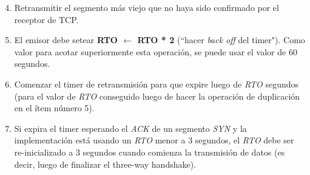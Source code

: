 \begin{enumerate}
 \setcounter{enumi}{3}
 \item Retransmitir el segmento más viejo que no haya sido confirmado
	por el receptor de TCP.
 \item El emisor debe setear \textbf{RTO $\leftarrow$ RTO * 2} (``hacer
	\textit{back off} del timer"). Como valor para acotar superiormente
	esta operación, se puede usar el valor de 60 segundos.
 \item Comenzar el timer de retransmisión para que expire luego de \textit{RTO}
	segundos (para el valor de \textit{RTO} conseguido luego de hacer la
	operación de duplicación en el ítem número 5).
 \item Si expira el timer esperando el \textit{ACK} de un segmento \textit{SYN}
	y la implementación está usando un \textit{RTO} menor a 3 segundos, el
	\textit{RTO} debe ser re-inicializado a 3 segundos cuando comienza la
	transmisión de datos (es decir, luego de finalizar el three-way 
handshake).
\end{enumerate}
